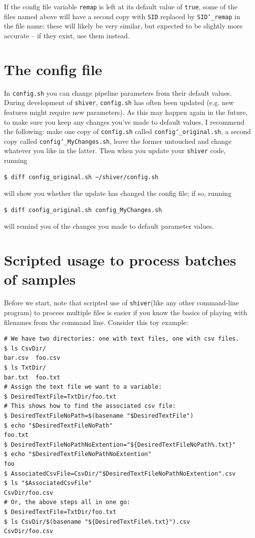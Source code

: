 \documentclass{article}
\newcommand{\shiv}{\texttt{shiver}\xspace}
\let\c\texttt
\begin{document}
If the config file variable \c{remap} is left at its default value of \c{true}, some of the files named above will have a second copy with \c{SID} replaced by \c{SID\char`_remap} in the file name: these will likely be very similar, but expected to be slightly more accurate -- if they exist, use them instead.

\section{The config file}
In \c{config.sh} you can change pipeline parameters from their default values.
During development of \shiv, \c{config.sh} has often been updated (e.g. new features might require new parameters).
As this may happen again in the future, to make sure you keep any changes you've made to default values, I recommend the following: make one copy of \c{config.sh} called \c{config\char`_original.sh}, a second copy called \c{config\char`_MyChanges.sh}, leave the former untouched and change whatever you like in the latter.
Then when you update your \shiv code, running
\begin{Verbatim}[samepage=true]
$ diff config_original.sh ~/shiver/config.sh
\end{Verbatim}
will show you whether the update has changed the config file; if so, running
\begin{Verbatim}[samepage=true]
$ diff config_original.sh config_MyChanges.sh
\end{Verbatim}
will remind you of the changes you made to default parameter values.


\section{Scripted usage to process batches of samples}
Before we start, note that scripted use of \shiv (like any other command-line program) to process multiple files is easier if you know the basics of playing with filenames from the command line.
Consider this toy example:
\begin{Verbatim}[samepage=true]
# We have two directories: one with text files, one with csv files.
$ ls CsvDir/
bar.csv  foo.csv
$ ls TxtDir/
bar.txt  foo.txt
# Assign the text file we want to a variable:
$ DesiredTextFile=TxtDir/foo.txt
# This shows how to find the associated csv file:
$ DesiredTextFileNoPath=$(basename "$DesiredTextFile")
$ echo "$DesiredTextFileNoPath"
foo.txt
$ DesiredTextFileNoPathNoExtention="${DesiredTextFileNoPath%.txt}"
$ echo "$DesiredTextFileNoPathNoExtention"
foo
$ AssociatedCsvFile=CsvDir/"$DesiredTextFileNoPathNoExtention".csv
$ ls "$AssociatedCsvFile"
CsvDir/foo.csv
# Or, the above steps all in one go:
$ DesiredTextFile=TxtDir/foo.txt
$ ls CsvDir/$(basename "${DesiredTextFile%.txt}").csv
CsvDir/foo.csv
\end{Verbatim}
\end{document}
